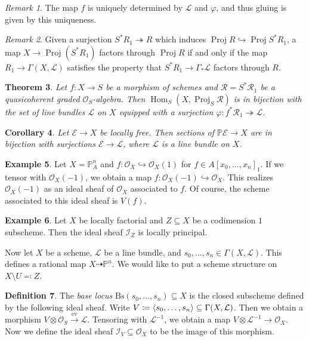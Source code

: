 \documentclass[leqno, openany]{memoir}
\newtheorem{thm}{Theorem}[section]
\newtheorem{cor}[thm]{Corollary}
\theoremstyle{definition}
\newtheorem{defn}[thm]{Definition}
\newtheorem{exm}[thm]{Example}
\theoremstyle{remark}
\newtheorem{rmk}[thm]{Remark}
\theoremstyle{plain}
\theoremstyle{definition}
\theoremstyle{remark}
\renewcommand{\P}{\mathbb{P}}
\newcommand{\mc}[1]{\mathcal{#1}}
\newcommand{\mr}[1]{\mathrm{#1}}
\DeclareMathOperator{\Hom}{Hom}
\DeclareMathOperator{\Proj}{Proj}
\begin{document}
\begin{rmk}
    The map $f$ is uniquely determined by $\mc{L}$ and $\varphi$, and thus gluing is given by this uniqueness.
\end{rmk}

\begin{rmk}
    Given a surjection $S^* R_1 \twoheadrightarrow R$ which induces $\Proj R \hookrightarrow \Proj S^* R_1$, a map $X \to \Proj(S^* R_1)$ factors through $\Proj R$ if and only if the map $R_1 \to \Gamma(X, \mc{L})$ satisfies the property that $S^* R_1 \to \Gamma_* \mc{L}$ factors through $R$.
\end{rmk}

\begin{thm}
    Let $f \colon X \to S$ be a morphism of schemes and $\mc{R} = S^* \mc{R}_1$ be a quasicoherent graded $\mc{O}_S$-algebra. Then $\Hom_S(X, \Proj_S \mc{R})$ is in bijection with the set of line bundles $\mc{L}$ on $X$ equipped with a surjection $\varphi \colon f^* \mc{R}_1 \twoheadrightarrow \mc{L}$.
\end{thm}

\begin{cor}
    Let $\mc{E} \to X$ be locally free. Then sections of $\P \mc{E} \to X$ are in bijection with surjections $\mc{E} \to \mc{L}$, where $\mc{L}$ is a line bundle on $X$.
\end{cor}

\begin{exm}
    Let $X = \P^n_A$ and $f \colon \mc{O}_X \hookrightarrow \mc{O}_X(1)$ for $f \in { A[x_0, \ldots, x_n] }_1$. If we tensor with $\mc{O}_X(-1)$, we obtain a map $f \colon \mc{O}_X(-1) \hookrightarrow \mc{O}_X$. This realizes $\mc{O}_X(-1)$ as an ideal sheaf of $\mc{O}_X$ associated to $f$. Of course, the scheme associated to this ideal sheaf is $V(f)$.
\end{exm}

\begin{exm}
    Let $X$ be locally factorial and $Z \subseteq X$ be a codimension $1$ subscheme. Then the ideal sheaf $\mc{I}_Z$ is locally principal.
\end{exm}

Now let $X$ be a scheme, $\mc{L}$ be a line bundle, and $s_0, \ldots, s_n \in \Gamma(X, \mc{L})$. This defines a rational map $X \dashrightarrow \P^n$. We would like to put a scheme structure on $X \setminus U \eqqcolon Z$.
\begin{defn}
    The \textit{base locus} $\mr{Bs}(s_0, \ldots, s_n) \subseteq X$ is the closed subscheme defined by the following ideal sheaf. Write $V \coloneqq \ev{s_0, \ldots, s_n} \subseteq \Gamma(X, \mc{L})$. Then we obtain a morphism $V \otimes \mc{O}_S \xrightarrow{\mr{ev}} \mc{L}$. Tensoring with $\mc{L}^{-1}$, we obtain a map $V \otimes \mc{L}^{-1} \to \mc{O}_X$. Now we define the ideal sheaf $\mc{I}_V \subseteq \mc{O}_X$ to be the image of this morphism.
\end{defn}
\end{document}

